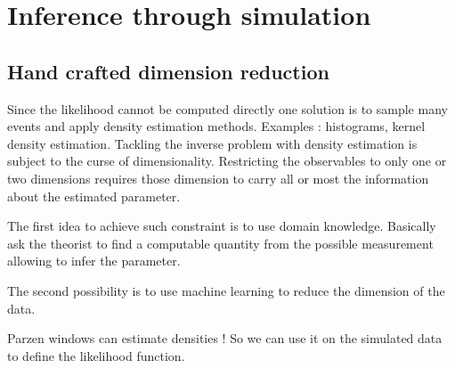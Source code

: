 \section{Inference through simulation} %
\label{sec:inference_through_simulation}













\subsection{Hand crafted dimension reduction} %
\label{sub:hand_crafted_dimension_reduction}

Since the likelihood cannot be computed directly one solution is to sample many events and apply density estimation methods.
Examples : histograms, kernel density estimation.
Tackling the inverse problem with density estimation is subject to the curse of dimensionality.
Restricting the observables to only one or two dimensions requires those dimension to carry all or most the information about the estimated parameter.

The first idea to achieve such constraint is to use domain knowledge.
Basically ask the theorist to find a computable quantity from the possible measurement allowing to infer the parameter.


The second possibility is to use machine learning to reduce the dimension of the data.


Parzen windows can estimate densities !
So we can use it on the simulated data to define the likelihood function.







